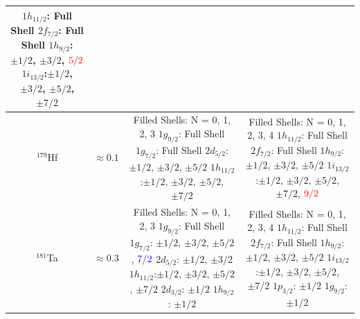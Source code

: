 \documentclass[10pt,a4paper, twoside]{report}
\begin{document}
\begin{table}[htbp]
\begin{adjustwidth}{-3cm}{-3cm}
\begin{tabular}{|c|c|c|c|}
{    $1h_{11/2}$: Full Shell \\
    $2f_{7/2}$: Full Shell \\
    $1h_{9/2}$: $\pm 1/2$, $\pm 3/2$, $\textcolor{red}{5/2}$ \\
    $1i_{13/2}$:$\pm 1/2$, $\pm 3/2$, $\pm 5/2$, $\pm 7/2$} \\
\midrule
$^{179}$Hf & $\approx 0.1$
    &  \pbox{20cm}{Filled Shells: N = 0, 1, 2, 3 \\
    $1g_{9/2}$: Full Shell \\
    $1g_{7/2}$: Full Shell \\
    $2d_{5/2}$: $\pm 1/2$, $\pm 3/2$, $\pm 5/2$ \\
    $1h_{11/2}$:$\pm 1/2$, $\pm 3/2$, $\pm 5/2$, $\pm 7/2$}          
    &  \pbox{20cm}{Filled Shells: N = 0, 1, 2, 3, 4 \\
    $1h_{11/2}$: Full Shell \\
    $2f_{7/2}$: Full Shell \\
    $1h_{9/2}$: $\pm 1/2$, $\pm 3/2$, $\pm 5/2$ \\
    $1i_{13/2}$:$\pm 1/2$, $\pm 3/2$, $\pm 5/2$, $\pm 7/2$, $\textcolor{red}{9/2}$} \\
\midrule
$^{181}$Ta & $\approx 0.3$
    &  \pbox{20cm}{Filled Shells: N = 0, 1, 2, 3 \\
    $1g_{9/2}$: Full Shell \\
    $1g_{7/2}$: $\pm 1/2$, $\pm 3/2$, $\pm 5/2$, $\textcolor{blue}{7/2}$ \\
    $2d_{5/2}$: $\pm 1/2$, $\pm 3/2$ \\
    $1h_{11/2}$:$\pm 1/2$, $\pm 3/2$, $\pm 5/2$, $\pm 7/2$ \\
    $2d_{3/2}$: $\pm 1/2$ \\
    $1h_{9/2}$: $\pm 1/2$}              
    &  \pbox{20cm}{Filled Shells: N = 0, 1, 2, 3, 4 \\
    $1h_{11/2}$: Full Shell \\
    $2f_{7/2}$: Full Shell \\
    $1h_{9/2}$: $\pm 1/2$, $\pm 3/2$, $\pm {5/2}$ \\
    $1i_{13/2}$:$\pm 1/2$, $\pm 3/2$, $\pm 5/2$, $\pm 7/2$ \\
    $1p_{3/2}$: $\pm 1/2$ \\
    $1g_{9/2}$: $\pm 1/2$} \\
\bottomrule
\bottomrule

\end{tabular}
\end{adjustwidth}
\end{table}
\end{document}
